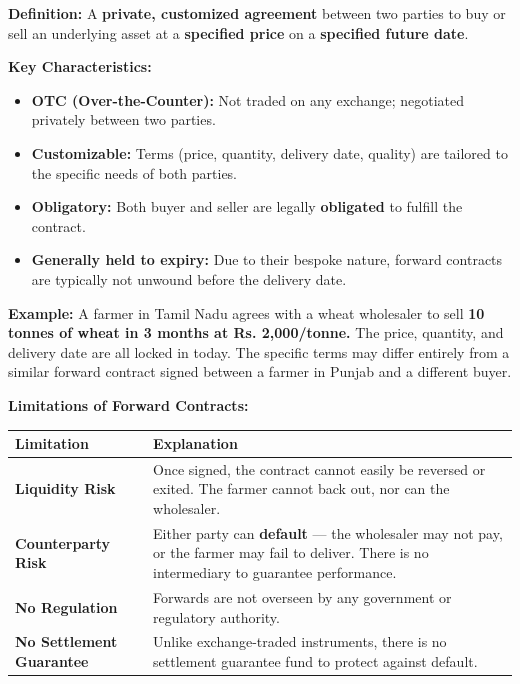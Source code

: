 \documentclass[12pt,openany]{book}
\begin{document}
\textbf{Definition:} A \textbf{private, customized agreement} between two parties to buy or sell an underlying asset at a \textbf{specified price} on a \textbf{specified future date}.

\textbf{Key Characteristics:}
\begin{itemize}[leftmargin=*]
    \item \textbf{OTC (Over-the-Counter):} Not traded on any exchange; negotiated privately between two parties.
    \item \textbf{Customizable:} Terms (price, quantity, delivery date, quality) are tailored to the specific needs of both parties.
    \item \textbf{Obligatory:} Both buyer and seller are legally \textbf{obligated} to fulfill the contract.
    \item \textbf{Generally held to expiry:} Due to their bespoke nature, forward contracts are typically not unwound before the delivery date.
\end{itemize}

\textbf{Example:}
A farmer in Tamil Nadu agrees with a wheat wholesaler to sell \textbf{10 tonnes of wheat in 3 months at Rs. 2,000/tonne.} The price, quantity, and delivery date are all locked in today. The specific terms may differ entirely from a similar forward contract signed between a farmer in Punjab and a different buyer.

\textbf{Limitations of Forward Contracts:}

\begin{center}
\small
\renewcommand{\arraystretch}{1.2}
\begin{tabular}{|L{0.26\textwidth}|L{0.64\textwidth}|}
\hline
\textbf{Limitation} & \textbf{Explanation} \\ \hline
\textbf{Liquidity Risk} & Once signed, the contract cannot easily be reversed or exited. The farmer cannot back out, nor can the wholesaler. \\ \hline
\textbf{Counterparty Risk} & Either party can \textbf{default} --- the wholesaler may not pay, or the farmer may fail to deliver. There is no intermediary to guarantee performance. \\ \hline
\textbf{No Regulation} & Forwards are not overseen by any government or regulatory authority. \\ \hline
\textbf{No Settlement Guarantee} & Unlike exchange-traded instruments, there is no settlement guarantee fund to protect against default. \\ \hline
\end{tabular}
\end{center}
\end{document}
